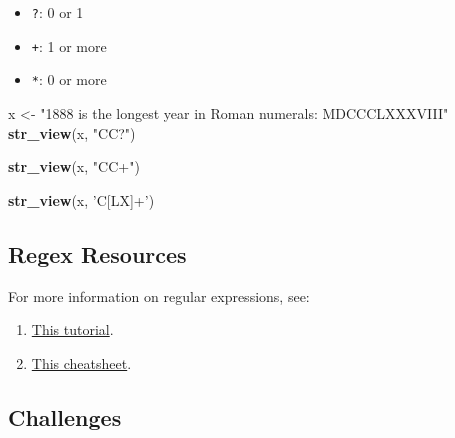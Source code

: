 \documentclass[
]{book}
\newenvironment{Shaded}{\begin{snugshade}}{\end{snugshade}}
\newcommand{\KeywordTok}[1]{\textcolor[rgb]{0.13,0.29,0.53}{\textbf{#1}}}
\newcommand{\NormalTok}[1]{#1}
\newcommand{\StringTok}[1]{\textcolor[rgb]{0.31,0.60,0.02}{#1}}
\providecommand{\tightlist}{%
  \setlength{\itemsep}{0pt}\setlength{\parskip}{0pt}}
\begin{document}
\begin{itemize}
\tightlist
\item
  \texttt{?}: 0 or 1
\item
  \texttt{+}: 1 or more
\item
  \texttt{*}: 0 or more
\end{itemize}

\begin{Shaded}
\begin{Highlighting}[]
\NormalTok{x <-}\StringTok{ "1888 is the longest year in Roman numerals: MDCCCLXXXVIII"}
\KeywordTok{str_view}\NormalTok{(x, }\StringTok{"CC?"}\NormalTok{)}
\end{Highlighting}
\end{Shaded}

\hypertarget{htmlwidget-416566eb193bf50d04e6}{}

\begin{Shaded}
\begin{Highlighting}[]
\KeywordTok{str_view}\NormalTok{(x, }\StringTok{"CC+"}\NormalTok{)}
\end{Highlighting}
\end{Shaded}

\hypertarget{htmlwidget-72cbf064100ce560a04c}{}

\begin{Shaded}
\begin{Highlighting}[]
\KeywordTok{str_view}\NormalTok{(x, }\StringTok{'C[LX]+'}\NormalTok{)}
\end{Highlighting}
\end{Shaded}

\hypertarget{htmlwidget-d11fc4360aa0230696d7}{}

\hypertarget{regex-resources}{%
\subsection{Regex Resources}\label{regex-resources}}

For more information on regular expressions, see:

\begin{enumerate}
\def\labelenumi{\arabic{enumi}.}
\tightlist
\item
  \href{http://regextutorials.com/}{This tutorial}.
\item
  \href{https://medium.com/factory-mind/regex-tutorial-a-simple-cheatsheet-by-examples-649dc1c3f285}{This cheatsheet}.
\end{enumerate}

\hypertarget{challenges-16}{%
\subsection{Challenges}\label{challenges-16}}
\end{document}

